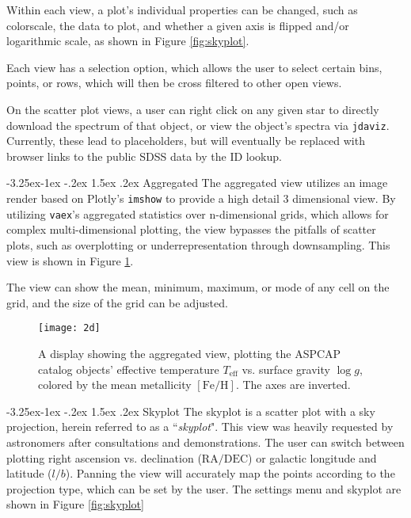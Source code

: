\documentclass[a4paper,10pt,twocolumn]{article}
\makeatletter
\renewcommand\paragraph{\@startsection{paragraph}{4}{\z@}%
	{-3.25ex\@plus -1ex \@minus -.2ex}%
	{1.5ex \@plus .2ex}%
	{\normalfont\normalsize\bfseries}}
\newcommand{\vaex}{\texttt{vaex}}
\makeatother
\begin{document}
Within each view, a plot's individual properties can be changed, such as colorscale, the data to plot, and whether a given axis is flipped and/or logarithmic scale, as shown in Figure \ref{fig:skyplot}.

Each view has a selection option, which allows the user to select certain bins, points, or rows, which will then be cross filtered to other open views.

On the scatter plot views, a user can right click on any given star to directly download the spectrum of that object, or view the object's spectra via \texttt{jdaviz}. Currently, these lead to placeholders, but will eventually be replaced with browser links to the public SDSS data by the ID lookup.

\paragraph{Aggregated}
\label{sec:aggregated}
The aggregated view utilizes an image render based on Plotly's \texttt{imshow} to provide a high detail 3 dimensional view. By utilizing \vaex's aggregated statistics over n-dimensional grids, which allows for complex multi-dimensional plotting, the view bypasses the pitfalls of scatter plots, such as overplotting or underrepresentation through downsampling. This view is shown in Figure \ref{fig:2d}.

The view can show the mean, minimum, maximum, or mode of any cell on the grid, and the size of the grid can be adjusted.

\begin{figure}[tp]
	\centering
	\texttt{[image: 2d]}
	\caption{A display showing the aggregated view, plotting the ASPCAP catalog objects' effective temperature $T_{\mathrm{eff} }$ vs. surface gravity $\log g$, colored by the mean metallicity $\mathrm{[Fe / H]} $. The axes are inverted.}
	\label{fig:2d}
\end{figure}

\paragraph{Skyplot}
\label{sec:skyplot}
The skyplot is a scatter plot with a sky projection, herein referred to as a ``\emph{skyplot}". This view was heavily requested by astronomers after consultations and demonstrations. The user can switch between plotting right ascension vs. declination ($\mathrm{RA / DEC} $) or galactic longitude and latitude ($l / b $). Panning the view will accurately map the points according to the projection type, which can be set by the user. The settings menu and skyplot are shown in Figure \ref{fig:skyplot}
\end{document}
